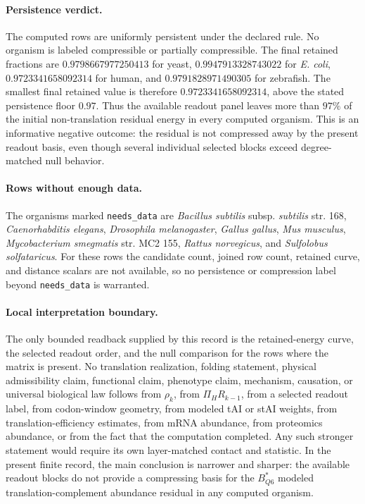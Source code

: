 \paragraph{Persistence verdict.}
The computed rows are uniformly persistent under the declared rule.  No organism is labeled compressible or partially compressible.  The final retained fractions are $0.9798667977250413$ for yeast, $0.9947913328743022$ for \emph{E. coli}, $0.9723341658092314$ for human, and $0.9791828971490305$ for zebrafish.  The smallest final retained value is therefore $0.9723341658092314$, above the stated persistence floor $0.97$.  Thus the available readout panel leaves more than $97\%$ of the initial non-translation residual energy in every computed organism.  This is an informative negative outcome: the residual is not compressed away by the present readout basis, even though several individual selected blocks exceed degree-matched null behavior.

\paragraph{Rows without enough data.}
The organisms marked \texttt{needs\_data} are \emph{Bacillus subtilis} subsp. \emph{subtilis} str. 168, \emph{Caenorhabditis elegans}, \emph{Drosophila melanogaster}, \emph{Gallus gallus}, \emph{Mus musculus}, \emph{Mycobacterium smegmatis} str. MC2 155, \emph{Rattus norvegicus}, and \emph{Sulfolobus solfataricus}.  For these rows the candidate count, joined row count, retained curve, and distance scalars are not available, so no persistence or compression label beyond \texttt{needs\_data} is warranted.

\paragraph{Local interpretation boundary.}
The only bounded readback supplied by this record is the retained-energy curve, the selected readout order, and the null comparison for the rows where the matrix is present.  No translation realization, folding statement, physical admissibility claim, functional claim, phenotype claim, mechanism, causation, or universal biological law follows from $\rho_k$, from $\Pi_H R_{k-1}$, from a selected readout label, from codon-window geometry, from modeled tAI or stAI weights, from translation-efficiency estimates, from mRNA abundance, from proteomics abundance, or from the fact that the computation completed.  Any such stronger statement would require its own layer-matched contact and statistic.  In the present finite record, the main conclusion is narrower and sharper: the available readout blocks do not provide a compressing basis for the $B^*_{Q6}$ modeled translation-complement abundance residual in any computed organism.

